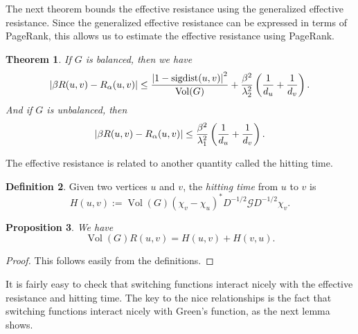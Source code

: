 \documentclass[12pt]{article}
\newtheorem{thm}{Theorem}
\newtheorem{prop}[thm]{Proposition}
\theoremstyle{definition}
\newtheorem{defn}[thm]{Definition}
\DeclarePairedDelimiter\abs{\lvert}{\rvert}
\DeclareMathOperator{\sigdist}{sigdist}
\DeclareMathOperator{\vol}{Vol}
\newcommand{\green}{\mathcal{G}}
\begin{document}
The next theorem bounds the effective resistance using the generalized effective resistance. Since the generalized effective resistance can be expressed in terms of PageRank, this allows us to estimate the effective resistance using PageRank.

\begin{thm}
If $G$ is balanced, then we have
$$
\abs*{\beta R(u, v) - R_\alpha (u, v)}
\leq \frac{\abs*{1 - \sigdist(u, v)}^2}{\vol(G)} + \frac{\beta^2}{\lambda_2^2}\left( \frac{1}{d_u} + \frac{1}{d_v} \right).
$$
And if $G$ is unbalanced, then
$$
\abs*{\beta R(u, v) - R_\alpha (u, v)}
\leq \frac{\beta^2}{\lambda_1^2}\left( \frac{1}{d_u} + \frac{1}{d_v} \right).
$$
\end{thm}

The effective resistance is related to another quantity called the hitting time.

\begin{defn}
Given two vertices $u$ and $v$, the \textit{hitting time} from $u$ to $v$ is 
$$
H(u, v) := \vol(G) (\chi_v - \chi_u)^* D^{-1/2} \green D^{-1/2} \chi_v.
$$  
\end{defn}

\begin{prop}
We have $$\vol(G) R(u, v) = H(u, v) + H(v, u).$$
\end{prop}
\begin{proof}
This follows easily from the definitions.
\end{proof}

It is fairly easy to check that switching functions interact nicely with the effective resistance and hitting time. The key to the nice relationships is the fact that switching functions interact nicely with Green's function, as the next lemma shows.
\end{document}
